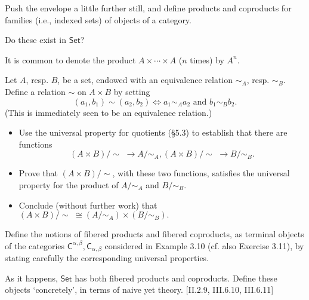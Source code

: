 \begin{problem}
  \def \Set {\mathsf{Set}}
  Push the envelope a little further still, and define products and coproducts
  for families (i.e., indexed sets) of objects of a category.

  Do these exist in $\Set$?

  It is common to denote the product $A\times\cdots\times A$ ($n$ times) by $A^n$.
\end{problem}

\begin{problem}
  \newcommand{\quot}[2]{#1/\!\!#2\,\,}
  \newcommand{\quotntws}[2]{#1/\!\!#2}
  Let $A$, resp. $B$, be a set, endowed with an equivalence relation $\sim_A$,
  resp. $\sim_B$.
  Define a relation $\sim$ on $A\times B$ by setting
  \[ (a_1, b_1) \sim (a_2, b_2) \iff a_1 \sim_A a_2 \text{ and } b_1 \sim_B b_2. \]
  (This is immediately seen to be an equivalence relation.)
  \begin{itemize}
  \item Use the universal property for quotients (\S5.3) to establish that there are
  functions
  \[ \quot{(A\times B)}{\sim} \to \quotntws{A}{\sim_A},
     \quot{(A\times B)}{\sim} \to \quotntws{B}{\sim_B}. \]
  \item Prove that $\quotntws{(A\times B)}{\sim}$, with these two functions,
  satisfies the universal property for the product of $\quotntws{A}{\sim_A}$ and
  $\quotntws{B}{\sim_B}$.
  \item Conclude (without further work) that $\quot{(A\times
  B)}{\sim}\cong(\quotntws{A}{\sim_A})\times(\quotntws{B}{\sim_B}).$
  \end{itemize}
\end{problem}

\begin{problem}
  \def \C {\mathsf{C}}
  \def \Set {\mathsf{Set}}
  Define the notions of fibered products and fibered coproducts, as terminal
  objects of the categories $\C^{\alpha,\beta}, \C_{\alpha,\beta}$ considered in
  Example 3.10 (cf. also Exercise 3.11), by stating carefully the corresponding
  universal properties.

  As it happens, $\Set$ has both fibered products and coproducts. Define these
  objects `concretely', in terms of naive yet theory. [II.2.9, III.6.10, III.6.11]
\end{problem}
